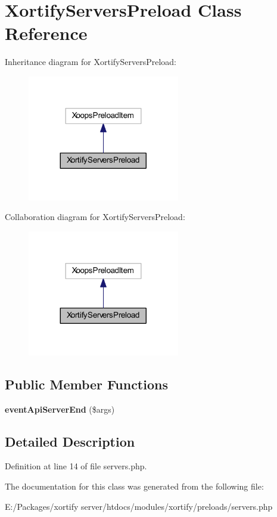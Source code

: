 \hypertarget{class_xortify_servers_preload}{\section{Xortify\-Servers\-Preload Class Reference}
\label{class_xortify_servers_preload}
}


Inheritance diagram for Xortify\-Servers\-Preload\-:
\nopagebreak
\begin{figure}[H]
\begin{center}
\leavevmode
\includegraphics[width=188pt]{class_xortify_servers_preload__inherit__graph}
\end{center}
\end{figure}


Collaboration diagram for Xortify\-Servers\-Preload\-:
\nopagebreak
\begin{figure}[H]
\begin{center}
\leavevmode
\includegraphics[width=188pt]{class_xortify_servers_preload__coll__graph}
\end{center}
\end{figure}
\subsection*{Public Member Functions}
\begin{DoxyCompactItemize}
\item 
\hypertarget{class_xortify_servers_preload_a62e459a2f1d1676b74b93eaa0e01bd02}{{\bfseries event\-Api\-Server\-End} (\$args)}\label{class_xortify_servers_preload_a62e459a2f1d1676b74b93eaa0e01bd02}

\end{DoxyCompactItemize}


\subsection{Detailed Description}


Definition at line 14 of file servers.\-php.



The documentation for this class was generated from the following file\-:\begin{DoxyCompactItemize}
\item 
E\-:/\-Packages/xortify server/htdocs/modules/xortify/preloads/servers.\-php\end{DoxyCompactItemize}
